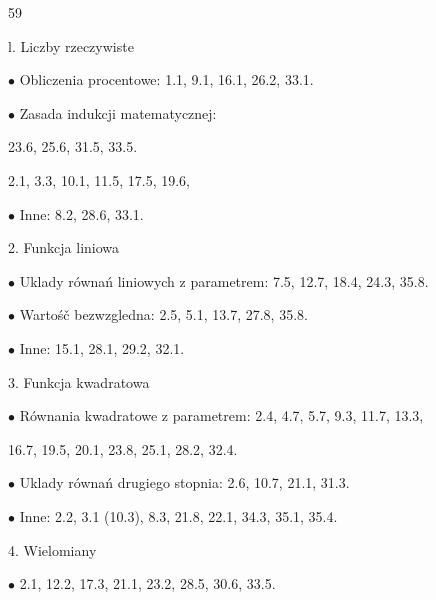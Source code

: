 \documentclass[a4paper,12pt]{article}
\begin{document}
59

l. Liczby rzeczywiste

$\bullet$ Obliczenia procentowe: 1.1, 9.1, 16.1, 26.2, 33.1.

$\bullet$ Zasada indukcji matematycznej:

23.6, 25.6, 31.5, 33.5.

2.1, 3.3, 10.1, 11.5, 17.5, 19.6,

$\bullet$ Inne: 8.2, 28.6, 33.1.

2. Funkcja liniowa

$\bullet$ Uklady równań liniowych $\mathrm{z}$ parametrem: 7.5, 12.7, 18.4, 24.3, 35.8.

$\bullet$ Wartośč bezwzgledna: 2.5, 5.1, 13.7, 27.8, 35.8.

$\bullet$ Inne: 15.1, 28.1, 29.2, 32.1.

3. Funkcja kwadratowa

$\bullet$ Równania kwadratowe $\mathrm{z}$ parametrem: 2.4, 4.7, 5.7, 9.3, 11.7, 13.3,

16.7, 19.5, 20.1, 23.8, 25.1, 28.2, 32.4.

$\bullet$ Uklady równań drugiego stopnia: 2.6, 10.7, 21.1, 31.3.

$\bullet$ Inne: 2.2, 3.1 (10.3), 8.3, 21.8, 22.1, 34.3, 35.1, 35.4.

4. Wielomiany

$\bullet$ 2.1, 12.2, 17.3, 21.1, 23.2, 28.5, 30.6, 33.5.
\end{document}
